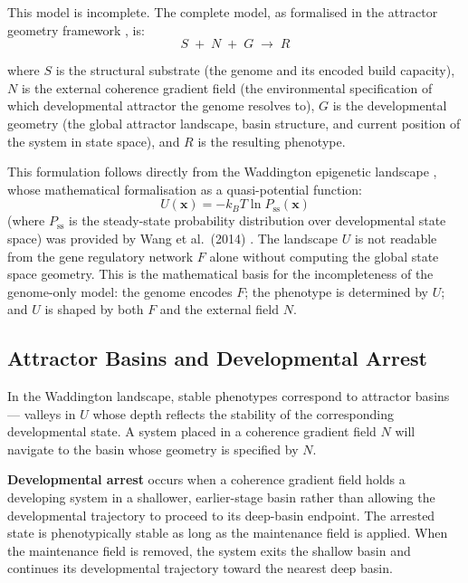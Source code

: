 \documentclass[11pt, a4paper]{article}
\begin{document}
This model is incomplete. The complete model, as
formalised in the attractor geometry framework
\cite{kauffman1993, huang2009, wang2014}, is:
\[
  S \;+\; N \;+\; G \;\rightarrow\; R
\]

where $S$ is the structural substrate (the genome and
its encoded build capacity), $N$ is the external
coherence gradient field (the environmental specification
of which developmental attractor the genome resolves to),
$G$ is the developmental geometry (the global attractor
landscape, basin structure, and current position of
the system in state space), and $R$ is the resulting
phenotype.

This formulation follows directly from the Waddington
epigenetic landscape \cite{waddington1957}, whose
mathematical formalisation as a quasi-potential function:
\[
  U(\mathbf{x}) = -k_B T \ln P_{\text{ss}}(\mathbf{x})
\]
(where $P_{\text{ss}}$ is the steady-state probability
distribution over developmental state space) was
provided by Wang et al.\ (2014) \cite{wang2014}. The
landscape $U$ is not readable from the gene regulatory
network $F$ alone without computing the global state
space geometry. This is the mathematical basis for the
incompleteness of the genome-only model: the genome
encodes $F$; the phenotype is determined by $U$; and
$U$ is shaped by both $F$ and the external field $N$.

\subsection{Attractor Basins and Developmental Arrest}

In the Waddington landscape, stable phenotypes
correspond to attractor basins --- valleys in $U$
whose depth reflects the stability of the corresponding
developmental state. A system placed in a coherence
gradient field $N$ will navigate to the basin whose
geometry is specified by $N$.

\textbf{Developmental arrest} occurs when a coherence
gradient field holds a developing system in a
shallower, earlier-stage basin rather than allowing
the developmental trajectory to proceed to its
deep-basin endpoint. The arrested state is
phenotypically stable as long as the maintenance
field is applied. When the maintenance field is
removed, the system exits the shallow basin and
continues its developmental trajectory toward the
nearest deep basin.
\end{document}
